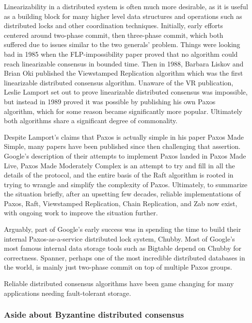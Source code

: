 \documentclass[a4paper,10pt]{article}
\begin{document}
Linearizability in a distributed system is often much more desirable, as it
is useful as a building block for many higher level data structures and
operations such as distributed locks and other coordination techniques.
Initially, early efforts centered around two-phase commit, then three-phase
commit, which both suffered due to issues similar to the two generals' problem.
Things were looking bad in 1985 when the FLP-impossibility paper\cite{flp}
proved that no algorithm could reach linearizable consensus in bounded time.
Then in 1988, Barbara Liskov and Brian Oki published the Viewstamped Replication
algorithm\cite{vr} which was the first linearizable distributed consensus
algorithm. Unaware of the VR publication, Leslie Lamport set out to
prove linearizable distributed consensus was impossible\cite{paxos-note}, but
instead in 1989 proved it was possible by publishing his own Paxos
algorithm\cite{paxos}, which for some reason became significantly more popular.
Ultimately both algorithms share a significant degree of commonality.

Despite Lamport's claims that Paxos is actually simple in his paper
Paxos Made Simple\cite{paxos-simple}, many papers have been published since
then challenging that assertion. Google's description of their attempts to
implement Paxos landed in Paxos Made Live\cite{paxos-live}, Paxos Made
Moderately Complex\cite{paxos-complex} is an attempt to try and fill in all the
details of the protocol, and the entire basis of the Raft algorithm is rooted
in trying to wrangle and simplify the complexity of Paxos\cite{raft}.
Ultimately, to summarize the situation briefly, after an upsetting few decades,
reliable implementations of Paxos, Raft, Viewstamped Replication\cite{vrr},
Chain Replication\cite{chain-rep}, and Zab\cite{zab} now exist, with ongoing
work to improve the situation further\cite{epaxos}\cite{paxos-flexible}.

Arguably, part of Google's early success was in spending the time to build
their internal Paxos-as-a-service distributed lock system, Chubby\cite{chubby}.
Most of Google's most famous internal data storage tools such as
Bigtable\cite{bigtable} depend on Chubby for correctness.
Spanner\cite{spanner}, perhaps one of the most incredible distributed databases
in the world, is mainly just two-phase commit on top of multiple Paxos groups.

Reliable distributed consensus algorithms have been game changing for
many applications needing fault-tolerant storage.

\subsubsection{Aside about Byzantine distributed consensus}
\end{document}
